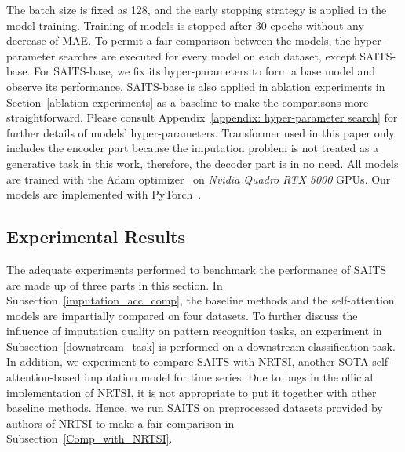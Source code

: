 \documentclass{article}
\begin{document}
The batch size is fixed as 128, and the early stopping strategy is applied in the model training. Training of models is stopped after 30 epochs without any decrease of MAE. To permit a fair comparison between the models, the hyper-parameter searches are executed for every model on each dataset, except SAITS-base. For SAITS-base, we fix its hyper-parameters to form a base model and observe its performance. SAITS-base is also applied in ablation experiments in Section~\ref{ablation experiments} as a baseline to make the comparisons more straightforward. Please consult Appendix~\ref{appendix: hyper-parameter search} for further details of models' hyper-parameters. Transformer used in this paper only includes the encoder part because the imputation problem is not treated as a generative task in this work, therefore, the decoder part is in no need. All models are trained with the Adam optimizer~\cite{Kingma2015Adam} on \textit{Nvidia Quadro RTX 5000} GPUs. Our models are implemented with PyTorch~\cite{Paszke2019PyTorch}.

\subsection{Experimental Results} \label{experimental_results}
The adequate experiments performed to benchmark the performance of SAITS are made up of three parts in this section. In Subsection~\ref{imputation_acc_comp}, the baseline methods and the self-attention models are impartially compared on four datasets. To further discuss the influence of imputation quality on pattern recognition tasks, an experiment in Subsection~\ref{downstream_task} is performed on a downstream classification task. In addition, we experiment to compare SAITS with NRTSI, another SOTA self-attention-based imputation model for time series. Due to bugs in the official implementation of NRTSI, it is not appropriate to put it together with other baseline methods. Hence, we run SAITS on preprocessed datasets provided by authors of NRTSI to make a fair comparison in Subsection~\ref{Comp_with_NRTSI}.
\end{document}
